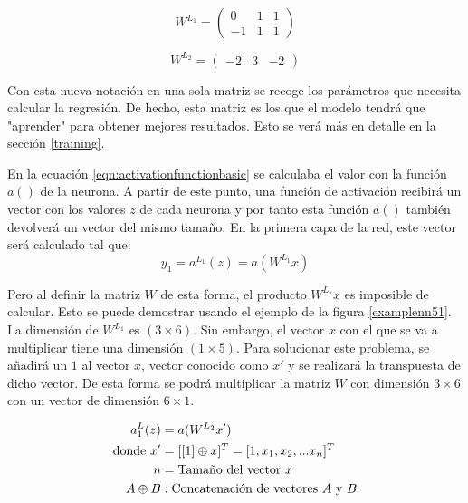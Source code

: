 \begin{equation}
  W^{L_1} = \begin{pmatrix}
  0 & 1 & 1 \\ 
  -1 & 1 & 1
  \end{pmatrix}
\end{equation}

\begin{equation}
  W^{L_2} = \begin{pmatrix}
  -2 & 3 & -2
  \end{pmatrix}
\end{equation}

Con esta nueva notación en una sola matriz se recoge los parámetros que necesita calcular la regresión. De hecho, esta matriz es los que el modelo tendrá que "aprender" para obtener mejores resultados. Esto se verá más en detalle en la sección \ref{training}.
\newline

En la ecuación \ref{eqn:activationfunctionbasic} se calculaba el valor con la función $a()$ de la neurona. A partir de este punto, una función de activación recibirá un vector con los valores $z$ de cada neurona y por tanto esta función $a()$ también devolverá un vector del mismo tamaño. En la primera capa de la red, este vector será calculado tal que:
\begin{equation}
  y_1 = a^{L_1}(z) = a(W^{L_1}x)
  \label{eqn:activationmatrixwrong}
\end{equation}

Pero al definir la matriz $W$ de esta forma, el producto $W^{L_1}x$ es imposible de calcular. Esto se puede demostrar usando el ejemplo de la figura \ref{examplenn51}. La dimensión de $W^{L_1}$ es $(3 \times 6)$. Sin embargo, el vector $x$ con el que se va a multiplicar tiene una dimensión $(1 \times 5)$. Para solucionar este problema, se añadirá un $1$ al vector $x$, vector conocido como $x'$ y se realizará la transpuesta de dicho vector. De esta forma se podrá multiplicar la matriz $W$ con dimensión $3\times6$ con un vector de dimensión $6\times1$.

\begin{equation}
\centering
    \begin{split}
  a^L_1(z) &= a(W^{L_2}x') \\
    \text{donde}~x' &= [[1] \oplus x]^T = [1, x_1, x_2, ... x_n]^T \\
    n &= \text{Tamaño del vector } x \\
    A \oplus B &: \text{Concatenación de vectores } A \text{ y } B
  \end{split}
  \label{eqn:newactivationsimple}
\end{equation}

